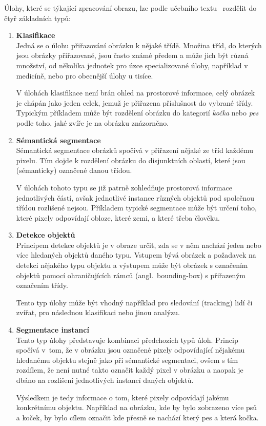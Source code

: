 Úlohy, které se týkající zpracování obrazu, lze podle učebního textu~\cite{conv-gruber} rozdělit do čtyř základních typů:
\begin{enumerate}
	\item \textbf{Klasifikace}\\
	      Jedná se o úlohu přiřazování obrázku k nějaké třídě.
	      Množina tříd, do kterých jsou obrázky přiřazované, jsou často známé předem a může jich být různá množství,
	      od několika jednotek pro úzce specializované úlohy, například v medicíně, nebo pro obecnější úlohy u tisíce.

	      V úlohách klasifikace není brán ohled na prostorové informace, celý obrázek je chápán jako jeden celek,
	      jemuž je přiřazena příslušnost do vybrané třídy.
	      Typickým příkladem může být rozdělení obrázku do kategorií \emph{kočka} nebo \emph{pes} podle toho,
	      jaké zvíře je na obrázku znázorněno.
	\item \textbf{Sémantická segmentace}\\
	      Sémantická segmentace obrázků spočívá v přiřazení nějaké ze tříd každému pixelu.
	      Tím dojde k rozdělení obrázku do disjunktních oblastí, které jsou (sémanticky) označené danou třídou.

	      V úlohách tohoto typu se již patrně zohledňuje prostorová informace jednotlivých částí,
	      avšak jednotlivé instance různých objektů pod společnou třídou rozlišené nejsou.
	      Příkladem typické segmentace může být určení toho, které pixely odpovídají obloze, které zemi, a které třeba člověku.

	      \newpage
	\item \textbf{Detekce objektů}\\
	      Principem detekce objektů je v obraze určit, zda se v něm nachází jeden nebo více hledaných objektů daného typu.
	      Vstupem bývá obrázek a požadavek na detekci nějakého typu objektu a výstupem může být obrázek s označením
	      objektů pomocí ohraničujících rámců (angl.~bounding-box) s přiřazeným označením třídy.

	      Tento typ úlohy může být vhodný například pro sledování (tracking) lidí či zvířat, pro následnou klasifikaci nebo jinou analýzu.

	\item \textbf{Segmentace instancí}\\
	      Tento typ úlohy představuje kombinaci předchozích typů úloh.
	      Princip spočívá v~tom, že v obrázku jsou označené pixely odpovídající nějakému hledanému objektu stejně jako při
	      sémantické segmentaci, ovšem s tím rozdílem, že není nutné takto označit každý pixel v obrázku a naopak je
	      dbáno na rozlišení jednotlivých instancí daných objektů.

	      Výsledkem je tedy informace o tom, které pixely odpovídají jakému konkrétnímu objektu.
	      Například na obrázku, kde by bylo zobrazeno více psů a koček, by bylo cílem označit kde přesně se nachází
	      který pes a která kočka.
\end{enumerate}

